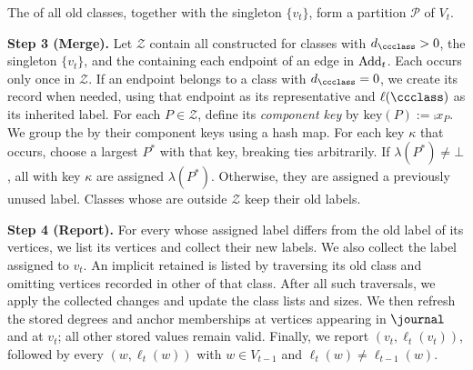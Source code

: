 The  of all old classes, together with the singleton $ \{v_t\} $, form a partition $ \mathcal P $ of $ V_t $.

\noindent\textbf{Step 3 (Merge).}
Let $ \mathcal Z $ contain all  constructed for classes with $ d_{\ccclass}>0 $, the singleton $ \{v_t\} $, and the \piece{} containing each endpoint of an edge in $ \mathrm{Add}_{t} $.
Each \piece{} occurs only once in $ \mathcal Z $.
If an endpoint belongs to a class with $ d_{\ccclass}=0 $, we create its \piece{} record when needed, using that endpoint as its representative and $ \ell(\ccclass) $ as its inherited label.
For each $ P\in\mathcal Z $, define its \emph{component key} by $ \mathrm{key}(P):=\comp{x_P} $.
We group the  by their component keys using a hash map.
For each key $ \kappa $ that occurs, choose a largest \piece{} $ P^* $ with that key, breaking ties arbitrarily.
If $ \lambda(P^*)\ne\bot $, all  with key $ \kappa $ are assigned $ \lambda(P^*) $.
Otherwise, they are assigned a previously unused label.
Classes whose  are outside $ \mathcal Z $ keep their old labels.

\noindent\textbf{Step 4 (Report).}
For every \piece{} whose assigned label differs from the old label of its vertices, we list its vertices and collect their new labels.
We also collect the label assigned to $ v_t $.
An implicit retained \piece{} is listed by traversing its old class and omitting vertices recorded in other  of that class.
After all such traversals, we apply the collected changes and update the class lists and sizes.
We then refresh the stored degrees and anchor memberships at vertices appearing in $ \journal $ and at $ v_t $; all other stored values remain valid.
Finally, we report $ (v_t,\ell_t(v_t)) $, followed by every $ (w,\ell_t(w)) $ with $ w\in V_{t-1} $ and $ \ell_t(w)\ne\ell_{t-1}(w) $.

